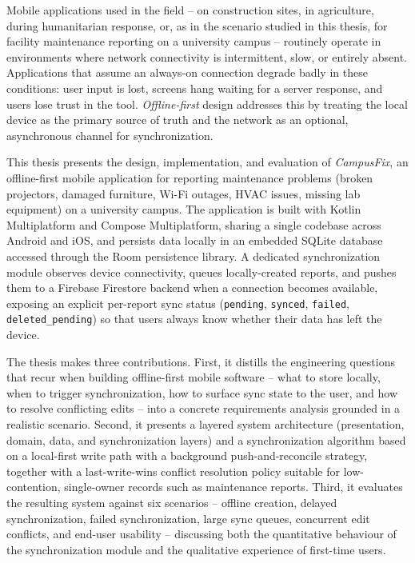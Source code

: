 
Mobile applications used in the field -- on construction sites, in
agriculture, during humanitarian response, or, as in the scenario studied
in this thesis, for facility maintenance reporting on a university campus
-- routinely operate in environments where network connectivity is
intermittent, slow, or entirely absent. Applications that assume an
always-on connection degrade badly in these conditions: user input is
lost, screens hang waiting for a server response, and users lose trust in
the tool. \emph{Offline-first} design addresses this by treating the local
device as the primary source of truth and the network as an optional,
asynchronous channel for synchronization.

This thesis presents the design, implementation, and evaluation of
\emph{CampusFix}, an offline-first mobile application for reporting
maintenance problems (broken projectors, damaged furniture, Wi-Fi outages,
HVAC issues, missing lab equipment) on a university campus. The application
is built with Kotlin Multiplatform and Compose Multiplatform, sharing a
single codebase across Android and iOS, and persists data locally in an
embedded SQLite database accessed through the Room persistence library. A
dedicated synchronization module observes device connectivity, queues
locally-created reports, and pushes them to a Firebase Firestore backend
when a connection becomes available, exposing an explicit per-report sync
status (\texttt{pending}, \texttt{synced}, \texttt{failed},
\texttt{deleted\_pending}) so that users always know whether their data has
left the device.

The thesis makes three contributions. First, it distills the engineering
questions that recur when building offline-first mobile software -- what to
store locally, when to trigger synchronization, how to surface sync state
to the user, and how to resolve conflicting edits -- into a concrete
requirements analysis grounded in a realistic scenario. Second, it presents
a layered system architecture (presentation, domain, data, and
synchronization layers) and a synchronization algorithm based on a
local-first write path with a background push-and-reconcile strategy,
together with a last-write-wins conflict resolution policy suitable for
low-contention, single-owner records such as maintenance reports. Third, it
evaluates the resulting system against six scenarios -- offline creation,
delayed synchronization, failed synchronization, large sync queues,
concurrent edit conflicts, and end-user usability -- discussing both the
quantitative behaviour of the synchronization module and the qualitative
experience of first-time users.

